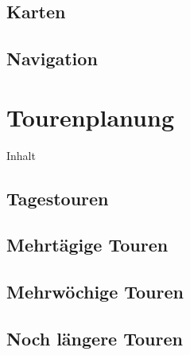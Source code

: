 \documentclass{beamer}
\begin{document}
		\subsection{Karten}
			
			\begin{frame}{}
			\end{frame}
		
		\subsection{Navigation}
			
			\begin{frame}{}
			\end{frame}
	
	\section{Tourenplanung}
		
		\begin{frame}[t]{Inhalt}
		\end{frame}
	
		\subsection{Tagestouren}
			
			\begin{frame}{}
			\end{frame}
			
		\subsection{Mehrtägige Touren}
			
			\begin{frame}{}
			\end{frame}
		
		\subsection{Mehrwöchige Touren}
			
			\begin{frame}{}
			\end{frame}
		
		\subsection{Noch längere Touren}
			
\end{document}
